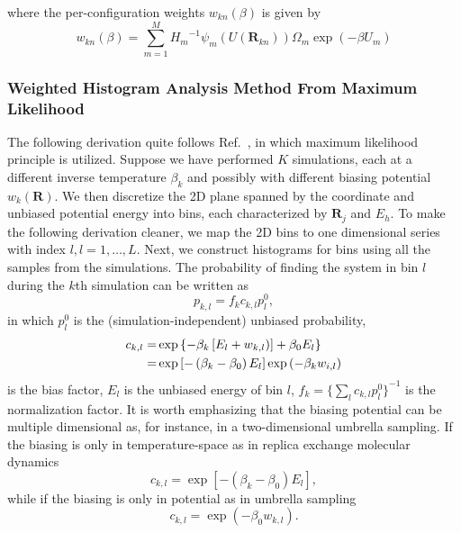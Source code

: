 where the per-configuration weights $w_{kn}(\beta)$ is given by
\begin{equation}
w_{kn}(\beta)=\sum\limits_{m=1}^M{H_{m}}^{-1}\psi_m(U(\mathbf{R}_{kn}))\Omega_m\exp{(-\beta U_m)}
\end{equation}

\subsubsection{Weighted Histogram Analysis Method From Maximum Likelihood}
The following derivation quite follows Ref.~\cite{GallicchioJPCB2005}, in which maximum likelihood principle is utilized. 
Suppose we have performed $K$ simulations, each at a different inverse temperature $\beta_k$ and possibly with different biasing potential $w_k(\mathbf{R})$.
We then discretize the 2D plane spanned by the coordinate and unbiased potential energy into bins, each characterized by ${\mathbf{R}_j}$ and ${E_h}$. To make the following derivation cleaner, we map the 2D bins to one dimensional series with index $l, l=1,\dots,L$. Next, we construct histograms for bins using all the samples from the simulations. The probability of finding the system in bin $l$ during the $k$th simulation can be written as
\begin{equation}
p_{k,l}=f_kc_{k,l}p_l^0,
\end{equation}
in which $p_l^0$ is the (simulation-independent) unbiased probability,
\begin{align}
c_{k,l}=&\exp{\left\{-\beta_k\left[E_l+w_{k,l})\right]+\beta_0E_l\right\}}\notag\\
       =&\exp{\left[-\left(\beta_k-\beta_0\right)E_l\right]}\exp{\left(-\beta_kw_{i,l}\right)}
\end{align}
is the bias factor, $E_l$ is the unbiased energy of bin $l$, $f_k={\{\sum\limits_lc_{k,l}p_l^0\}}^{-1}$ is the normalization factor.
It is worth emphasizing that the biasing potential can be multiple dimensional as, for instance, in a two-dimensional umbrella sampling.
If the biasing is only in temperature-space as in replica exchange molecular dynamics
\begin{equation}
c_{k,l}=\exp{\left[-\left(\beta_k-\beta_0\right)E_l\right]},
\end{equation} 
while if the biasing is only in potential as in umbrella sampling
\begin{equation}
c_{k,l}=\exp{\left(-\beta_0w_{k,l}\right)}.
\end{equation}

